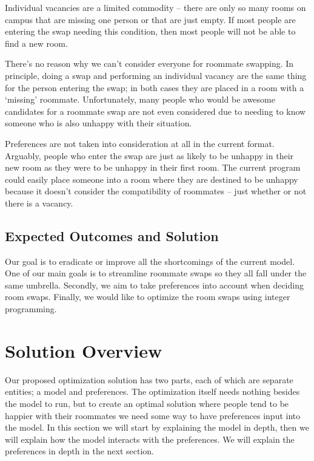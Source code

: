 \documentclass[12pt]{article}
\begin{document}
\begin{multicols}{2}
Individual vacancies are a limited commodity – there are only so many rooms on campus that are missing one person or that are just empty. If most people are entering the swap needing this condition, then most people will not be able to find a new room. 

There’s no reason why we can’t consider everyone for roommate swapping. In principle, doing a swap and performing an individual vacancy are the same thing for the person entering the swap; in both cases they are placed in a room with a ‘missing’ roommate. Unfortunately, many people who would be awesome candidates for a roommate swap are not even considered due to needing to know someone who is also unhappy with their situation.

Preferences are not taken into consideration at all in the current format. Arguably, people who enter the swap are just as likely to be unhappy in their new room as they were to be unhappy in their first room. The current program could easily place someone into a room where they are destined to be unhappy because it doesn’t consider the compatibility of roommates – just whether or not there is a vacancy.

\subsection{Expected Outcomes and Solution}
Our goal is to eradicate or improve all the shortcomings of the current model. One of our main goals is to streamline roommate swaps so they all fall under the same umbrella. Secondly, we aim to take preferences into account when deciding room swaps. Finally, we would like to optimize the room swaps using integer programming.

\section{Solution Overview}
Our proposed optimization solution has two parts, each of which are separate entities; a model and preferences. The optimization itself needs nothing besides the model to run, but to create an optimal solution where people tend to be happier with their roommates we need some way to have preferences input into the model. In this section we will start by explaining the model in depth, then we will explain how the model interacts with the preferences. We will explain the preferences in depth in the next section.


\end{multicols}
\end{document}
